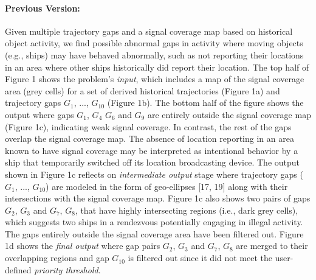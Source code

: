 \documentclass[twoside,leqno,onecolumn]{article}
\begin{document}
\paragraph{Previous Version:} Given multiple trajectory gaps and a signal coverage map based on historical object activity, we find possible abnormal gaps in activity where moving objects (e.g., ships) may have behaved abnormally, such as not reporting their locations in an area where other ships historically did report their location. The top half of Figure 1 shows the problem's \textit{input}, which includes a map of the signal coverage area (grey cells) for a set of derived historical trajectories (Figure  1a) and trajectory gaps $G_{1}$, ..., $G_{10}$ (Figure 1b). The bottom half of the figure shows the output where gaps $G_{1}$, $G_{4}$ $G_{6}$ and $G_{9}$ are entirely outside the signal coverage map (Figure 1c), indicating weak signal coverage. In contrast, the rest of the gaps overlap the signal coverage map. The absence of location reporting in an area known to have signal coverage may be interpreted as intentional behavior by a ship that temporarily switched off its location broadcasting device. The output shown in Figure 1c reflects on \textit{intermediate output} stage where trajectory gaps ($G_{1}$, ..., $G_{10}$) are modeled in the form of geo-ellipses [17, 19] along with their intersections with the signal coverage map. Figure 1c also shows two pairs of gaps $G_{2}$, $G_{3}$ and $G_{7}$, $G_{8}$, that have highly intersecting regions (i.e., dark grey cells), which suggests two ships in a rendezvous potentially engaging in illegal activity. The gaps entirely outside the signal coverage area have been filtered out. Figure 1d shows the \textit{final output} where gap pairs $G_{2}$, $G_{3}$ and $G_{7}$, $G_{8}$ are merged to their overlapping regions and gap $G_{10}$ is filtered out since it did not meet the user-defined \textit{priority threshold}.\\


\end{document}
